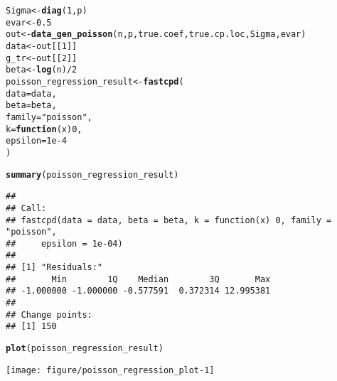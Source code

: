 \documentclass[article]{jss}\usepackage[]{graphicx}\usepackage[]{xcolor}
\makeatletter
\def\maxwidth{ %
  \ifdim\Gin@nat@width>\linewidth
    \linewidth
  \else
    \Gin@nat@width
  \fi
}
\newcommand{\hlnum}[1]{\textcolor[rgb]{0.686,0.059,0.569}{#1}}%
\newcommand{\hlstr}[1]{\textcolor[rgb]{0.192,0.494,0.8}{#1}}%
\newcommand{\hlopt}[1]{\textcolor[rgb]{0,0,0}{#1}}%
\newcommand{\hlstd}[1]{\textcolor[rgb]{0.345,0.345,0.345}{#1}}%
\newcommand{\hlkwa}[1]{\textcolor[rgb]{0.161,0.373,0.58}{\textbf{#1}}}%
\newcommand{\hlkwb}[1]{\textcolor[rgb]{0.69,0.353,0.396}{#1}}%
\newcommand{\hlkwc}[1]{\textcolor[rgb]{0.333,0.667,0.333}{#1}}%
\newcommand{\hlkwd}[1]{\textcolor[rgb]{0.737,0.353,0.396}{\textbf{#1}}}%
\newenvironment{kframe}{%
 \def\at@end@of@kframe{}%
 \ifinner\ifhmode%
  \def\at@end@of@kframe{\end{minipage}}%
  \begin{minipage}{\columnwidth}%
 \fi\fi%
 \def\FrameCommand##1{\hskip\@totalleftmargin \hskip-\fboxsep
 \colorbox{shadecolor}{##1}\hskip-\fboxsep
     \hskip-\linewidth \hskip-\@totalleftmargin \hskip\columnwidth}%
 \MakeFramed {\advance\hsize-\width
   \@totalleftmargin\z@ \linewidth\hsize
   \@setminipage}}%
 {\par\unskip\endMakeFramed%
 \at@end@of@kframe}
\newenvironment{knitrout}{}{} %
\makeatother
\begin{document}
\begin{knitrout}
\begin{kframe}
\begin{alltt}
\hlstd{Sigma} \hlkwb{<-} \hlkwd{diag}\hlstd{(}\hlnum{1}\hlstd{, p)}
\hlstd{evar} \hlkwb{<-} \hlnum{0.5}
\hlstd{out} \hlkwb{<-} \hlkwd{data_gen_poisson}\hlstd{(n, p, true.coef, true.cp.loc, Sigma, evar)}
\hlstd{data} \hlkwb{<-} \hlstd{out[[}\hlnum{1}\hlstd{]]}
\hlstd{g_tr} \hlkwb{<-} \hlstd{out[[}\hlnum{2}\hlstd{]]}
\hlstd{beta} \hlkwb{<-} \hlkwd{log}\hlstd{(n)}\hlopt{/}\hlnum{2}
\hlstd{poisson_regression_result} \hlkwb{<-} \hlkwd{fastcpd}\hlstd{(}
  \hlkwc{data} \hlstd{= data,}
  \hlkwc{beta} \hlstd{= beta,}
  \hlkwc{family} \hlstd{=} \hlstr{"poisson"}\hlstd{,}
  \hlkwc{k} \hlstd{=} \hlkwa{function}\hlstd{(}\hlkwc{x}\hlstd{)} \hlnum{0}\hlstd{,}
  \hlkwc{epsilon} \hlstd{=} \hlnum{1e-4}
\hlstd{)}
\end{alltt}
\end{kframe}
\end{knitrout}
%

\begin{knitrout}
\color{fgcolor}\begin{kframe}
\begin{alltt}
\hlkwd{summary}\hlstd{(poisson_regression_result)}
\end{alltt}
\begin{verbatim}
## 
## Call:
## fastcpd(data = data, beta = beta, k = function(x) 0, family = "poisson", 
##     epsilon = 1e-04)
## 
## [1] "Residuals:"
##       Min        1Q    Median        3Q       Max 
## -1.000000 -1.000000 -0.577591  0.372314 12.995381 
## 
## Change points:
## [1] 150
\end{verbatim}
\begin{alltt}
\hlkwd{plot}\hlstd{(poisson_regression_result)}
\end{alltt}
\end{kframe}
\texttt{[image: figure/poisson\_regression\_plot-1]} 
\end{knitrout}
\end{document}
